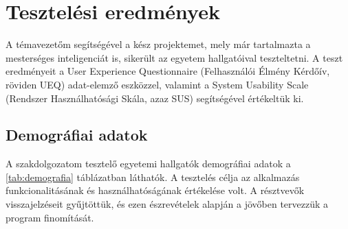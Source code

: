 \chapter{Tesztelési eredmények}

\thispagestyle{fancy}
\pagestyle{fancy}

A témavezetőm segítségével a kész projektemet, mely már tartalmazta a mesterséges inteligenciát is,  sikerült az egyetem hallgatóival teszteltetni.
A teszt eredményeit a User Experience Questionnaire (Felhasználói Élmény Kérdőív, röviden UEQ) adat-elemző eszközzel, valamint a System Usability Scale (Rendszer Használhatósági Skála, azaz SUS) segítségével értékeltük ki. 

\section{Demográfiai adatok}
A szakdolgozatom tesztelő egyetemi hallgatók demográfiai adatok a \ref{tab:demografia} táblázatban láthatók. A tesztelés célja az alkalmazás funkcionalitásának és használhatóságának értékelése volt. A résztvevők visszajelzéseit gyűjtöttük, és ezen észrevételek alapján a jövőben tervezzük a program finomítását.

\vspace{1cm}

